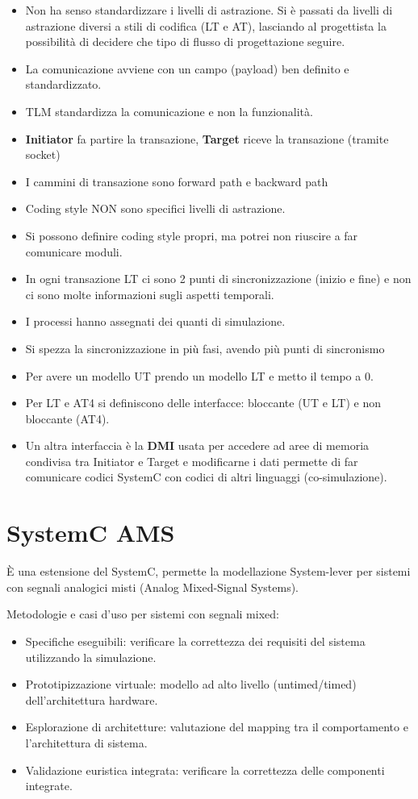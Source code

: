 \documentclass[a4paper]{article}
\begin{document}
	\begin{itemize}
		\item Non ha senso standardizzare i livelli di astrazione. Si è passati da livelli di astrazione diversi a stili di codifica (LT e AT), lasciando al progettista la possibilità di decidere che tipo di flusso di progettazione seguire.
		\item La comunicazione avviene con un campo (payload) ben definito e standardizzato.
		\item TLM standardizza la comunicazione e non la funzionalità.
		\item \textbf{Initiator} fa partire la transazione, \textbf{Target} riceve la transazione (tramite socket)
		\item I cammini di transazione sono forward path e backward path
		\item Coding style NON sono specifici livelli di astrazione.
		\item Si possono definire coding style propri, ma potrei non riuscire a far comunicare moduli.
		\item In ogni transazione LT ci sono 2 punti di sincronizzazione (inizio e fine) e non ci sono molte informazioni sugli aspetti temporali.
		\item I processi hanno assegnati dei quanti di simulazione.
		\item Si spezza la sincronizzazione in più fasi, avendo più punti di sincronismo
		\item Per avere un modello UT prendo un modello LT e metto il tempo a 0.
		\item Per LT e AT4 si definiscono delle interfacce: bloccante (UT e LT) e non bloccante (AT4).
		\item Un altra interfaccia è la \textbf{DMI} usata per accedere ad aree di memoria condivisa tra Initiator e Target e modificarne i dati permette di far comunicare codici SystemC con codici di altri linguaggi (co-simulazione).
	\end{itemize}

	\section{SystemC AMS}
		È una estensione del SystemC, permette la modellazione System-lever per sistemi con segnali analogici misti (Analog Mixed-Signal Systems). 
		
		\noindent
		Metodologie e casi d'uso per sistemi con segnali mixed:
		\begin{itemize}
			\item Specifiche eseguibili: verificare la correttezza dei requisiti del sistema utilizzando la simulazione.
			\item Prototipizzazione virtuale: modello ad alto livello (untimed/timed) dell'architettura hardware.
			\item Esplorazione di architetture: valutazione del mapping tra il comportamento e l'architettura di sistema.
			\item Validazione euristica integrata: verificare la correttezza delle componenti integrate.
		\end{itemize}
		
\end{document}
